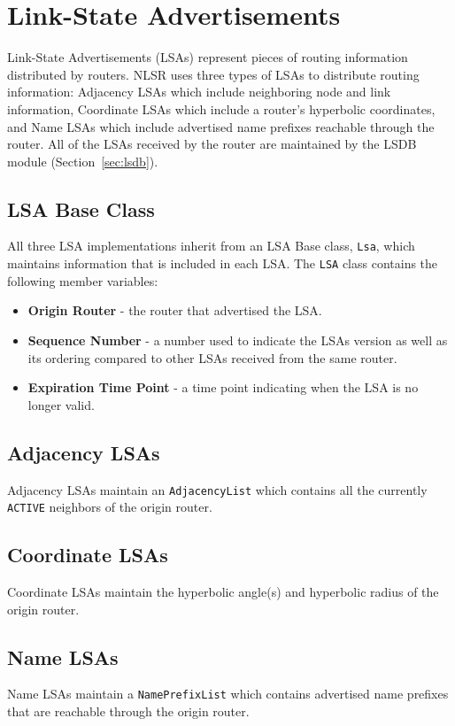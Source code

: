\section{Link-State Advertisements}
\label{sec:lsas}

Link-State Advertisements (LSAs) represent pieces of routing information distributed by routers.
NLSR uses three types of LSAs to distribute routing information:
Adjacency LSAs which include neighboring node and link information,
Coordinate LSAs which include a router's hyperbolic coordinates, and
Name LSAs which include advertised name prefixes reachable through the router.
All of the LSAs received by the router are maintained by the LSDB module (Section~\ref{sec:lsdb}).

\subsection{LSA Base Class}
\label{sec:lsa-base-class}

All three LSA implementations inherit from an LSA Base class, \texttt{Lsa}, which maintains information that is included in each LSA.
The \texttt{LSA} class contains the following member variables:
\begin{itemize}
\item \textbf{Origin Router} - the router that advertised the LSA.
\item \textbf{Sequence Number} - a number used to indicate the LSAs version as well as its ordering compared to other LSAs received from the same router.
\item \textbf{Expiration Time Point} - a time point indicating when the LSA is no longer valid.
\end{itemize}

\subsection{Adjacency LSAs}
\label{sec:adjacency-lsas}

Adjacency LSAs maintain an \texttt{AdjacencyList} which contains all the currently \texttt{ACTIVE} neighbors of the origin router.

\subsection{Coordinate LSAs}
\label{sec:coordinate-lsas}

Coordinate LSAs maintain the hyperbolic angle(s) and hyperbolic radius of the origin router.

\subsection{Name LSAs}
\label{sec:name-lsas}

Name LSAs maintain a \texttt{NamePrefixList} which contains advertised name prefixes that are reachable through the origin router.
